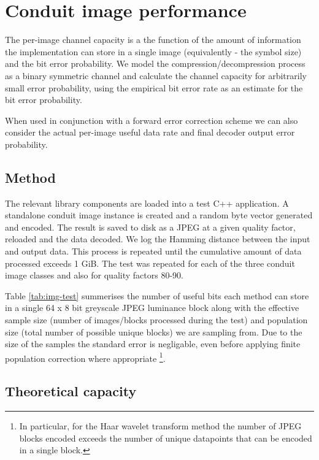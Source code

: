 \section{Conduit image performance}

The per-image channel capacity is a the function of the amount of information the implementation can store in a single image (equivalently - the symbol size) and the bit error probability. We model the compression/decompression process as a binary symmetric channel and calculate the channel capacity for arbitrarily small error probability, using the empirical bit error rate as an estimate for the bit error probability.

When used in conjunction with a forward error correction scheme we can also consider the actual per-image useful data rate and final decoder output error probability.


\subsection{Method}

The relevant library components are loaded into a test C++ application. A standalone conduit image instance is created and a random byte vector generated and encoded. The result is saved to disk as a JPEG at a given quality factor, reloaded and the data decoded. We log the Hamming distance between the input and output data. This process is repeated until the cumulative amount of data processed exceeds 1 GiB. The test was repeated for each of the three conduit image classes and also for quality factors 80-90.



Table \ref{tab:img-test} summerises the number of useful bits each method can store in a single 64 x 8 bit greyscale JPEG luminance block along with the effective sample size (number of images/blocks processed during the test) and population size (total number of possible unique blocks) we are sampling from. Due to the size of the samples the standard error is negligable, even before applying finite population correction where appropriate \footnote{In particular, for the Haar wavelet transform method the number of JPEG blocks encoded exceeds the number of unique datapoints that can be encoded in a single block.}.




\subsection{Theoretical capacity}
\label{ssec:capacity}


